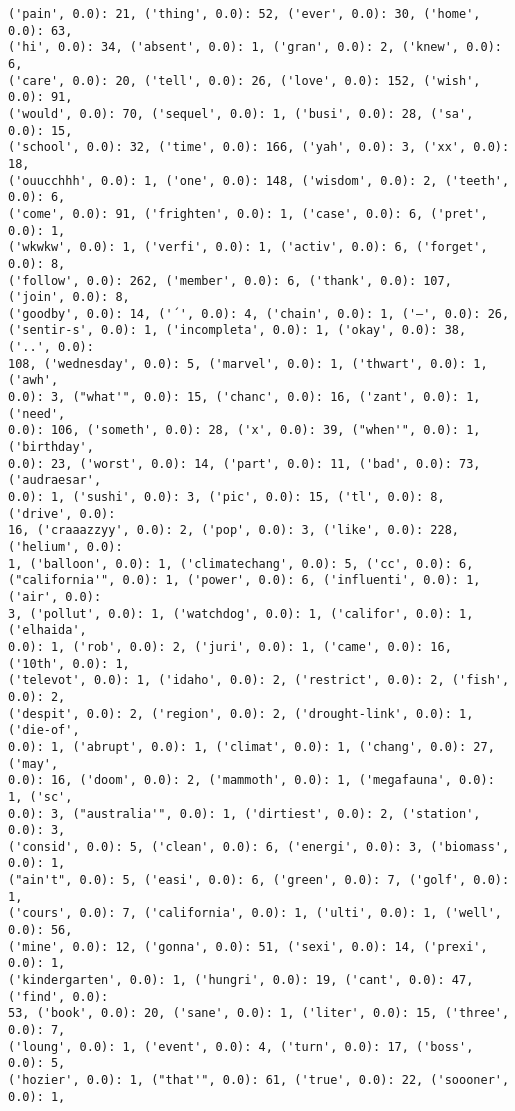 \documentclass[11pt]{article}
\begin{document}
\begin{Verbatim}[commandchars=\\\{\}]
('pain', 0.0): 21, ('thing', 0.0): 52, ('ever', 0.0): 30, ('home', 0.0): 63,
('hi', 0.0): 34, ('absent', 0.0): 1, ('gran', 0.0): 2, ('knew', 0.0): 6,
('care', 0.0): 20, ('tell', 0.0): 26, ('love', 0.0): 152, ('wish', 0.0): 91,
('would', 0.0): 70, ('sequel', 0.0): 1, ('busi', 0.0): 28, ('sa', 0.0): 15,
('school', 0.0): 32, ('time', 0.0): 166, ('yah', 0.0): 3, ('xx', 0.0): 18,
('ouucchhh', 0.0): 1, ('one', 0.0): 148, ('wisdom', 0.0): 2, ('teeth', 0.0): 6,
('come', 0.0): 91, ('frighten', 0.0): 1, ('case', 0.0): 6, ('pret', 0.0): 1,
('wkwkw', 0.0): 1, ('verfi', 0.0): 1, ('activ', 0.0): 6, ('forget', 0.0): 8,
('follow', 0.0): 262, ('member', 0.0): 6, ('thank', 0.0): 107, ('join', 0.0): 8,
('goodby', 0.0): 14, ('´', 0.0): 4, ('chain', 0.0): 1, ('—', 0.0): 26,
('sentir-s', 0.0): 1, ('incompleta', 0.0): 1, ('okay', 0.0): 38, ('..', 0.0):
108, ('wednesday', 0.0): 5, ('marvel', 0.0): 1, ('thwart', 0.0): 1, ('awh',
0.0): 3, ("what'", 0.0): 15, ('chanc', 0.0): 16, ('zant', 0.0): 1, ('need',
0.0): 106, ('someth', 0.0): 28, ('x', 0.0): 39, ("when'", 0.0): 1, ('birthday',
0.0): 23, ('worst', 0.0): 14, ('part', 0.0): 11, ('bad', 0.0): 73, ('audraesar',
0.0): 1, ('sushi', 0.0): 3, ('pic', 0.0): 15, ('tl', 0.0): 8, ('drive', 0.0):
16, ('craaazzyy', 0.0): 2, ('pop', 0.0): 3, ('like', 0.0): 228, ('helium', 0.0):
1, ('balloon', 0.0): 1, ('climatechang', 0.0): 5, ('cc', 0.0): 6,
("california'", 0.0): 1, ('power', 0.0): 6, ('influenti', 0.0): 1, ('air', 0.0):
3, ('pollut', 0.0): 1, ('watchdog', 0.0): 1, ('califor', 0.0): 1, ('elhaida',
0.0): 1, ('rob', 0.0): 2, ('juri', 0.0): 1, ('came', 0.0): 16, ('10th', 0.0): 1,
('televot', 0.0): 1, ('idaho', 0.0): 2, ('restrict', 0.0): 2, ('fish', 0.0): 2,
('despit', 0.0): 2, ('region', 0.0): 2, ('drought-link', 0.0): 1, ('die-of',
0.0): 1, ('abrupt', 0.0): 1, ('climat', 0.0): 1, ('chang', 0.0): 27, ('may',
0.0): 16, ('doom', 0.0): 2, ('mammoth', 0.0): 1, ('megafauna', 0.0): 1, ('sc',
0.0): 3, ("australia'", 0.0): 1, ('dirtiest', 0.0): 2, ('station', 0.0): 3,
('consid', 0.0): 5, ('clean', 0.0): 6, ('energi', 0.0): 3, ('biomass', 0.0): 1,
("ain't", 0.0): 5, ('easi', 0.0): 6, ('green', 0.0): 7, ('golf', 0.0): 1,
('cours', 0.0): 7, ('california', 0.0): 1, ('ulti', 0.0): 1, ('well', 0.0): 56,
('mine', 0.0): 12, ('gonna', 0.0): 51, ('sexi', 0.0): 14, ('prexi', 0.0): 1,
('kindergarten', 0.0): 1, ('hungri', 0.0): 19, ('cant', 0.0): 47, ('find', 0.0):
53, ('book', 0.0): 20, ('sane', 0.0): 1, ('liter', 0.0): 15, ('three', 0.0): 7,
('loung', 0.0): 1, ('event', 0.0): 4, ('turn', 0.0): 17, ('boss', 0.0): 5,
('hozier', 0.0): 1, ("that'", 0.0): 61, ('true', 0.0): 22, ('soooner', 0.0): 1,

\end{Verbatim}
\end{document}
